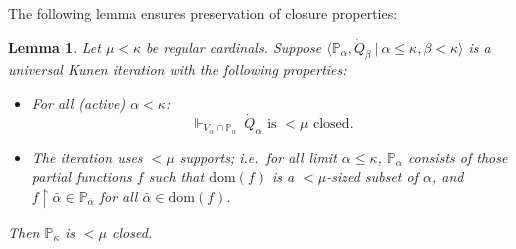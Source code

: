 \documentclass{amsart}
\newtheorem{lemma}[theorem]{Lemma}
\begin{document}
The following lemma ensures preservation of closure properties:
\begin{lemma}\label{lem_LessMuClosedIteration}
Let $\mu < \kappa$ be regular cardinals.  Suppose $\langle \mathbb{P}_\alpha,\dot{Q}_\beta \ | \ \alpha \le \kappa, \beta < \kappa \rangle$ is a universal Kunen iteration with the following properties:
\begin{itemize}
 \item For all (active) $\alpha < \kappa$:
 \[
 \Vdash_{V_\alpha \cap \mathbb{P}_\alpha} \ \dot{Q}_\alpha \text{ is } < \mu \text{ closed}.
 \]
 \item The iteration uses $<\mu$ supports; i.e.\ for all limit $\alpha \le \kappa$, $\mathbb{P}_\alpha$ consists of those partial functions $f$ such that $\text{dom}(f)$ is a $<\mu$-sized subset of $\alpha$, and $f \restriction \bar{\alpha} \in \mathbb{P}_{\bar{\alpha}}$ for all $\bar{\alpha} \in \text{dom}(f)$.
\end{itemize}
Then $\mathbb{P}_\kappa$ is $<\mu$ closed.
\end{lemma}
\end{document}
